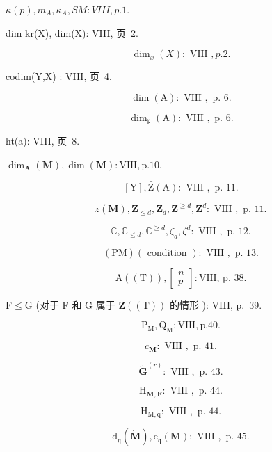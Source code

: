 

\(\kappa(p), m_A, \kappa_A, SM: VIII, p. 1.\)

dim kr(X), dim(X): VIII, 页~2.

\[
\dim_ {x} (X): \text { VIII }, p. 2.
\]

codim(Y,X) : VIII, 页~4.

\[
\dim (\mathrm{A}): \text { VIII }, \text { p. } 6.
\]

\[
\dim_ {\mathfrak {p}} (\mathrm{A}): \text { VIII }, \text { p. } 6.
\]

ht(a): VIII, 页~8.

\(\dim_{\mathbf{A}}(\mathbf{M}), \dim(\mathbf{M}) : \mathrm{VIII}, \mathrm{p.} 10.\)

\[
[ \mathrm{Y} ], \bar {\mathrm{Z}} (\mathrm{A}): \text { VIII }, \text { p. } 11.
\]

\[
z (\mathbf {M}), \mathbf {Z} _ {\leqslant d}, \mathbf {Z} _ {d}, \mathbf {Z} ^ {\geqslant d}, \mathbf {Z} ^ {d}: \text { VIII }, \text { p. } 11.
\]

\[
\mathbb {C}, \mathbb {C} _ {\leqslant d}, \mathbb {C} ^ {\geqslant d}, \zeta_ {d}, \zeta^ {d}: \text { VIII }, \text { p. } 12.
\]

\[
(\mathrm{PM}) (\text { condition }): \text { VIII }, \text { p. } 13.
\]

\[
\mathrm{A} ((\mathrm{T})), \left[ \begin{array}{c} n \\ p \end{array} \right]: \text {VIII, p. 38.}
\]

\(\mathrm{F} \leqslant \mathrm{G}\) (对于 F 和 G 属于 \(\mathbf{Z}((\mathrm{T}))\) 的情形 ): VIII, p.~39.

\[
\mathrm{P} _ {\mathrm{M}}, \mathrm{Q} _ {\mathrm{M}}: \mathrm{VIII}, \text {p.} 40.
\]

\[
c _ {\mathbf {M}}: \text { VIII }, \text { p. } 41.
\]

\[
\tilde {\mathbf {G}} ^ {(r)}: \text { VIII }, \text { p. } 43.
\]

\[
\mathrm{H} _ {\mathbf {M}, \mathbf {F}}: \text { VIII }, \text { p. } 44.
\]

\[
\mathrm{H} _ {\mathrm{M}, \mathrm{q}}: \text { VIII }, \text { p. } 44.
\]

\[
\mathrm{d} _ {\mathfrak {q}} (\dot {\mathbf {M}}), \mathrm{e} _ {\mathfrak {q}} (\mathbf {M}): \text { VIII }, \text { p. } 45.
\]

